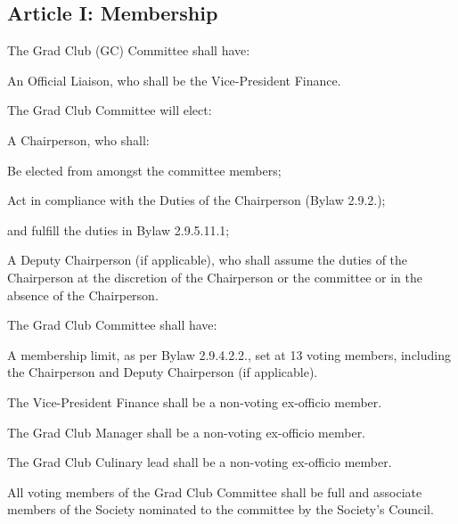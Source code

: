 \subsection{Article I: Membership}
\begin{longenum}[ label*=\thesubsection.\arabic*., align=left] 
\item The Grad Club (GC) Committee shall have:
	\begin{longenum}[ label*=\arabic*., align=left]
	\item An Official Liaison, who shall be the Vice-President Finance.
	\end{longenum}
\item The Grad Club Committee will elect:
	\begin{longenum}[ label*=\arabic*., align=left]
	\item A Chairperson, who shall:
		\begin{longenum}[ label*=\arabic*., align=left]
		\item Be elected from amongst the committee members;
		\item Act in compliance with the Duties of the Chairperson (Bylaw 2.9.2.);
		\item and fulfill the duties in Bylaw 2.9.5.11.1;
		\end{longenum}
	\item A Deputy Chairperson (if applicable), who shall assume the duties of the Chairperson at the discretion of the Chairperson or the committee or in the absence of the Chairperson.
	\end{longenum}
\item The Grad Club Committee shall have:
	\begin{longenum}[ label*=\arabic*., align=left]
	\item A membership limit, as per Bylaw 2.9.4.2.2., set at 13 voting members, including the Chairperson and Deputy Chairperson (if applicable).
	\end{longenum}
\item The Vice-President Finance shall be a non-voting ex-officio member.
\item The Grad Club Manager shall be a non-voting ex-officio member.
\item The Grad Club Culinary lead shall be a non-voting ex-officio member.
\item All voting members of the Grad Club Committee shall be full and associate members of the Society nominated to the committee by the Society’s Council.     
\end{longenum}

